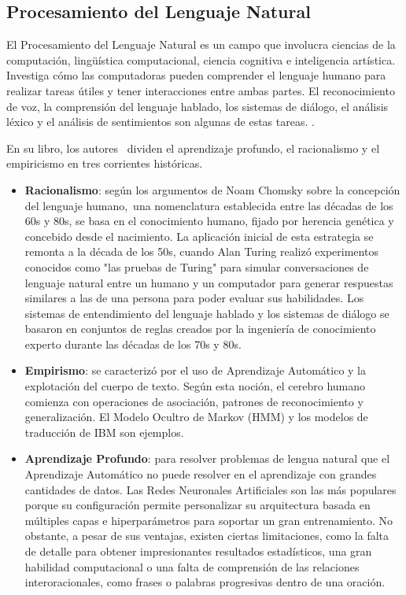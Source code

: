 \subsection{Procesamiento del Lenguaje Natural}
El Procesamiento del Lenguaje Natural es un campo que involucra ciencias de la computación, lingüística computacional, ciencia cognitiva e inteligencia artística. Investiga cómo las computadoras pueden comprender el lenguaje humano para realizar tareas útiles y tener interacciones entre ambas partes. El reconocimiento de voz, la comprensión del lenguaje hablado, los sistemas de diálogo, el análisis léxico y el análisis de sentimientos son algunas de estas tareas. \parencite{bk_deng2018deeplearningnlp}.

En su libro, los autores \citeauthor{bk_deng2018deeplearningnlp} dividen el aprendizaje profundo, el racionalismo y el empiricismo en tres corrientes históricas.

\begin{itemize}
	\item \textbf{Racionalismo}: según los argumentos de Noam Chomsky sobre la concepción del lenguaje humano, una nomenclatura establecida entre las décadas de los 60s y 80s, se basa en el conocimiento humano, fijado por herencia genética y concebido desde el nacimiento. La aplicación inicial de esta estrategia se remonta a la década de los 50s, cuando Alan Turing realizó experimentos conocidos como "las pruebas de Turing" para simular conversaciones de lenguaje natural entre un humano y un computador para generar respuestas similares a las de una persona para poder evaluar sus habilidades. Los sistemas de entendimiento del lenguaje hablado y los sistemas de diálogo se basaron en conjuntos de reglas creados por la ingeniería de conocimiento experto durante las décadas de los 70s y 80s.

	\item \textbf{Empirismo}: se caracterizó por el uso de Aprendizaje Automático y la explotación del cuerpo de texto. Según esta noción, el cerebro humano comienza con operaciones de asociación, patrones de reconocimiento y generalización. El Modelo Ocultro de Markov (HMM) y los modelos de traducción de IBM son ejemplos.
	
	\item \textbf{Aprendizaje Profundo}: para resolver problemas de lengua natural que el Aprendizaje Automático no puede resolver en el aprendizaje con grandes cantidades de datos. Las Redes Neuronales Artificiales son las más populares porque su configuración permite personalizar su arquitectura basada en múltiples capas e hiperparámetros para soportar un gran entrenamiento. No obstante, a pesar de sus ventajas, existen ciertas limitaciones, como la falta de detalle para obtener impresionantes resultados estadísticos, una gran habilidad computacional o una falta de comprensión de las relaciones interoracionales, como frases o palabras progresivas dentro de una oración.
\end{itemize}


